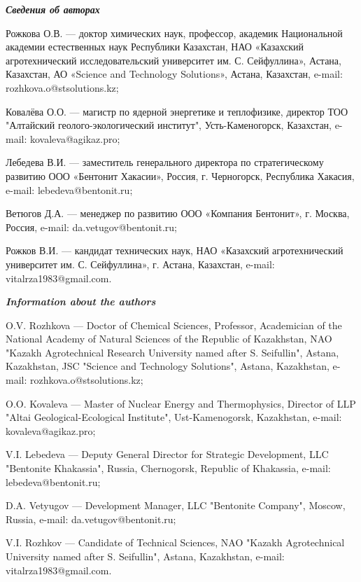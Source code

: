 \begin{authorinfo}
\hspace{1em}\emph{{\bfseries Сведения об авторах}}  

Рожкова О.В. — доктор химических наук, профессор, академик
Национальной академии естественных наук Республики Казахстан, НАО
«Казахский агротехнический исследовательский университет
им. С. Сейфуллина», Астана, Казахстан, АО «Science and Technology
Solutions», Астана, Казахстан, e-mail: rozhkova.o@stsolutions.kz;

Ковалёва О.О. — магистр по ядерной энергетике и теплофизике, директор
ТОО "Алтайский геолого-экологический институт", Усть-Каменогорск,
Казахстан, e-mail: kovaleva@agikaz.pro;

Лебедева В.И. — заместитель генерального директора по стратегическому
развитию ООО «Бентонит Хакасии», Россия, г. Черногорск, Республика
Хакасия, e-mail: lebedeva@bentonit.ru;

Ветюгов Д.А. — менеджер по развитию ООО «Компания Бентонит»,
г. Москва, Россия, e-mail: da.vetugov@bentonit.ru;

Рожков В.И. — кандидат технических наук, НАО «Казахский
агротехнический университет им. С. Сейфуллина», г. Астана, Казахстан,
e-mail: vitalrza1983@gmail.com.

\hspace{1em}\emph{{\bfseries Information about the authors}}  

O.V. Rozhkova — Doctor of Chemical Sciences, Professor, Academician of
the National Academy of Natural Sciences of the Republic of
Kazakhstan, NAO "Kazakh Agrotechnical Research University named after
S. Seifullin", Astana, Kazakhstan, JSC "Science and Technology
Solutions", Astana, Kazakhstan, e-mail: rozhkova.o@stsolutions.kz;

O.O. Kovaleva — Master of Nuclear Energy and Thermophysics, Director
of LLP "Altai Geological-Ecological Institute", Ust-Kamenogorsk,
Kazakhstan, e-mail: kovaleva@agikaz.pro;

V.I. Lebedeva — Deputy General Director for Strategic Development, LLC
"Bentonite Khakassia", Russia, Chernogorsk, Republic of Khakassia,
e-mail: lebedeva@bentonit.ru;

D.A. Vetyugov — Development Manager, LLC "Bentonite Company", Moscow,
Russia, e-mail: da.vetugov@bentonit.ru;

V.I. Rozhkov — Candidate of Technical Sciences, NAO "Kazakh
Agrotechnical University named after S. Seifullin", Astana,
Kazakhstan, e-mail: vitalrza1983@gmail.com.
\end{authorinfo}
